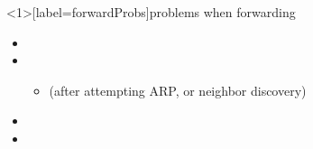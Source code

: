 \begin{frame}<1>[label=forwardProbs]{problems when forwarding}
    \begin{itemize}
    \item {}
    \item {}
        \begin{itemize}
        \item (after attempting ARP, or neighbor discovery)
        \end{itemize}
    \item {}
    \item {}
    \end{itemize}
\end{frame}
